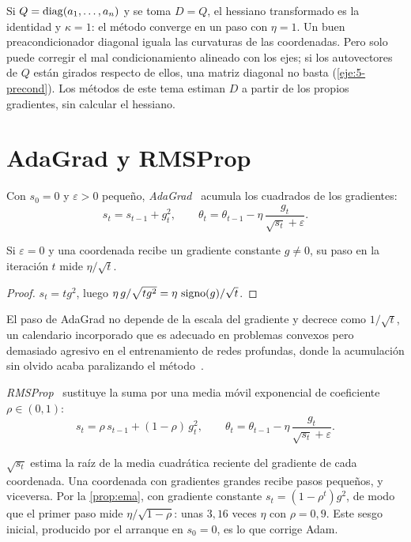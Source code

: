 Si $Q=\operatorname{diag}(a_1,\dots,a_n)$ y se toma $D=Q$, el hessiano transformado es la identidad y $\kappa=1$: el método converge en un paso con $\eta=1$. Un buen preacondicionador diagonal iguala las curvaturas de las coordenadas. Pero solo puede corregir el mal condicionamiento alineado con los ejes; si los autovectores de $Q$ están girados respecto de ellos, una matriz diagonal no basta (\cref{eje:5-precond}). Los métodos de este tema estiman $D$ a partir de los propios gradientes, sin calcular el hessiano.

\section{AdaGrad y RMSProp}

\begin{definicion}[AdaGrad]\label{def:adagrad}
Con $s_0=0$ y $\varepsilon>0$ pequeño, \emph{AdaGrad}~\cite{adagrad} acumula los cuadrados de los gradientes:
\[
s_t=s_{t-1}+g_t^{2},\qquad\theta_t=\theta_{t-1}-\eta\,\frac{g_t}{\sqrt{s_t}+\varepsilon}.
\]
\end{definicion}

\begin{proposicion}\label{prop:adagrad}
Si $\varepsilon=0$ y una coordenada recibe un gradiente constante $g\ne 0$, su paso en la iteración $t$ mide $\eta/\sqrt t$.
\end{proposicion}

\begin{proof}
$s_t=tg^{2}$, luego $\eta\,g/\sqrt{tg^{2}}=\eta\,\operatorname{signo}(g)/\sqrt t$.
\end{proof}

El paso de AdaGrad no depende de la escala del gradiente y decrece como $1/\sqrt t$, un calendario incorporado que es adecuado en problemas convexos pero demasiado agresivo en el entrenamiento de redes profundas, donde la acumulación sin olvido acaba paralizando el método~\cite[§8.5.1]{gbc}.

\begin{definicion}[RMSProp]\label{def:rmsprop}
\emph{RMSProp}~\cite{rmsprop} sustituye la suma por una media móvil exponencial de coeficiente $\rho\in(0,1)$:
\[
s_t=\rho\,s_{t-1}+(1-\rho)\,g_t^{2},\qquad\theta_t=\theta_{t-1}-\eta\,\frac{g_t}{\sqrt{s_t}+\varepsilon}.
\]
\end{definicion}

$\sqrt{s_t}$ estima la raíz de la media cuadrática reciente del gradiente de cada coordenada. Una coordenada con gradientes grandes recibe pasos pequeños, y viceversa. Por la \cref{prop:ema}, con gradiente constante $s_t=(1-\rho^{t})g^{2}$, de modo que el primer paso mide $\eta/\sqrt{1-\rho}$: unas $3{,}16$ veces $\eta$ con $\rho=0{,}9$. Este sesgo inicial, producido por el arranque en $s_0=0$, es lo que corrige Adam.

